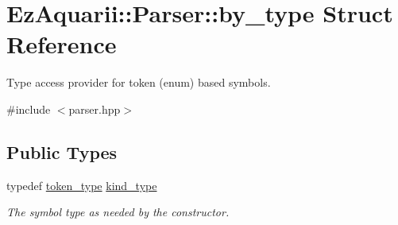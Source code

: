 \hypertarget{structEzAquarii_1_1Parser_1_1by__type}{}\section{Ez\+Aquarii\+:\+:Parser\+:\+:by\+\_\+type Struct Reference}
\label{structEzAquarii_1_1Parser_1_1by__type}


Type access provider for token (enum) based symbols.  




{\ttfamily \#include $<$parser.\+hpp$>$}

\subsection*{Public Types}
\begin{DoxyCompactItemize}
\item 
typedef \hyperlink{classEzAquarii_1_1Parser_a56291d58866809533c2eb3f54911674c}{token\+\_\+type} \hyperlink{structEzAquarii_1_1Parser_1_1by__type_ae6736318831cab4f8b3ab30f414a33e6}{kind\+\_\+type}\hypertarget{structEzAquarii_1_1Parser_1_1by__type_ae6736318831cab4f8b3ab30f414a33e6}{}\label{structEzAquarii_1_1Parser_1_1by__type_ae6736318831cab4f8b3ab30f414a33e6}

\begin{DoxyCompactList}\small\item\em The symbol type as needed by the constructor. \end{DoxyCompactList}\end{DoxyCompactItemize}
